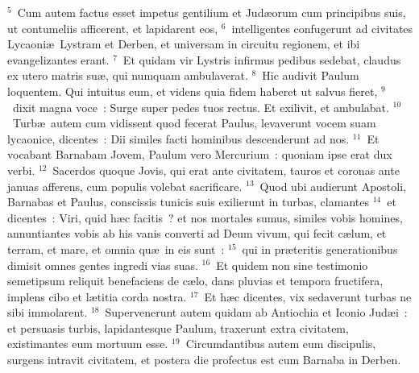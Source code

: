 ${}^{5}$~Cum autem factus esset impetus gentilium et Jud\ae orum cum principibus suis, ut contumeliis afficerent, et lapidarent eos,
${}^{6}$~intelligentes confugerunt ad civitates Lycaoni\ae\ Lystram et Derben, et universam in circuitu regionem, et ibi evangelizantes erant.
${}^{7}$~Et quidam vir Lystris infirmus pedibus sedebat, claudus ex utero matris su\ae , qui numquam ambulaverat.
${}^{8}$~Hic audivit Paulum loquentem. Qui intuitus eum, et videns quia fidem haberet ut salvus fieret,
${}^{9}$~dixit magna voce~: Surge super pedes tuos rectus. Et exilivit, et ambulabat.
${}^{10}$~Turb\ae\ autem cum vidissent quod fecerat Paulus, levaverunt vocem suam lycaonice, dicentes~: Dii similes facti hominibus descenderunt ad nos.
${}^{11}$~Et vocabant Barnabam Jovem, Paulum vero Mercurium~: quoniam ipse erat dux verbi.
${}^{12}$~Sacerdos quoque Jovis, qui erat ante civitatem, tauros et coronas ante januas afferens, cum populis volebat sacrificare.
${}^{13}$~Quod ubi audierunt Apostoli, Barnabas et Paulus, conscissis tunicis suis exilierunt in turbas, clamantes
${}^{14}$~et dicentes~: Viri, quid h\ae c facitis~? et nos mortales sumus, similes vobis homines, annuntiantes vobis ab his vanis converti ad Deum vivum, qui fecit c\ae lum, et terram, et mare, et omnia qu\ae\ in eis sunt~:
${}^{15}$~qui in pr\ae teritis generationibus dimisit omnes gentes ingredi vias suas.
${}^{16}$~Et quidem non sine testimonio semetipsum reliquit benefaciens de c\ae lo, dans pluvias et tempora fructifera, implens cibo et l\ae titia corda nostra.
${}^{17}$~Et h\ae c dicentes, vix sedaverunt turbas ne sibi immolarent.
${}^{18}$~Supervenerunt autem quidam ab Antiochia et Iconio Jud\ae i~: et persuasis turbis, lapidantesque Paulum, traxerunt extra civitatem, existimantes eum mortuum esse.
${}^{19}$~Circumdantibus autem eum discipulis, surgens intravit civitatem, et postera die profectus est cum Barnaba in Derben.


